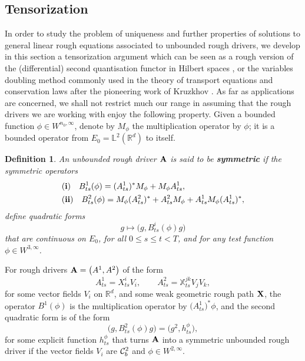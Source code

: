 \documentclass[11pt,a4paper]{amsart}
\newcommand{\RR}{\mathbb{R}}  \newcommand{\CC}{\mathbb{C}}  \newcommand{\LL}{\mathbb{L}}  \newcommand{\WW}{\mathbb{W}}
\newcommand{\bbX}{\mathbb{X}}
\renewcommand{\leq}{\leqslant}
\newtheorem{defn}[thm]{ \hspace{-0.3cm} {\sc Definition}}%
\numberwithin{equation}{section} %
\begin{document}
\bigskip


\subsection{Tensorization}
\label{SubsectionTensorization}

In order to study the problem of uniqueness and further properties of solutions to general linear rough equations associated to unbounded rough drivers, we develop in this section a tensorization argument which can be seen as a rough version of the (differential) second quantisation functor in Hilbert spaces \cite{ReedSimon}, or the variables doubling method commonly used in the theory of transport equations and conservation laws after the pioneering work of Kruzkhov \cite{Kruzkhov}. As far as applications are concerned, we shall not restrict much our range in assuming that the rough drivers we are working with enjoy the following property. Given a bounded function $\phi\in W^{n_0,\infty}$, denote by $M_\phi$ the multiplication operator by $\phi$; it is a bounded operator from $E_0 = \LL^2(\RR^d)$ to itself.

\begin{defn}
An unbounded rough driver $\bf A$ is said to be \textbf{\emph{symmetric}} if the symmetric operators 
\begin{equation*}
\begin{split}
&{\bf (i)}\quad B^1_{ts}(\phi) = (A^1_{ts})^*M_\phi  + M_\phi A^1_{ts} , \\
&{\bf (ii)}\quad B^2_{ts}(\phi) = M_\phi (A^2_{ts})^*  +  A^2_{ts}M_\phi + A_{ts}^1 M_\phi (A^1_{ts})^*,
\end{split}
\end{equation*}
define quadratic forms 
$$
g\mapsto \Big(g,B^i_{ts}(\phi)g\Big)
$$
that are continuous on $E_0$, for all $0\leq s\leq t<T$, and for any test function $\phi\in W^{3,\infty}$.
\end{defn}

For rough drivers ${\bf A} = \big(A^1,A^2\big)$ of the form 
$$
A^1_{ts} = X^i_{ts} V_i, \quad\quad A^2_{ts} = {\bbX}^{jk}_{ts} V_jV_k,
$$
for some vector fields $V_i$ on $\RR^d$, and some weak geometric rough path ${\bf X}$, the operator $B^1(\phi)$ is the multiplication operator by $\big(A^1_{ts}\big)^*\phi$, and the second quadratic form is of the form
$$
\Big(g,B^2_{ts}(\phi)g\Big) = \Big(g^2 , h^\phi_{ts}\Big),
$$
for some explicit function $h^\phi_{ts}$ that turns $\bf A$ into a symmetric unbounded rough driver if the vector fields $V_i$ are $\mathcal{C}^2_b$ and $\phi\in W^{2,\infty}$. 
\end{document}
